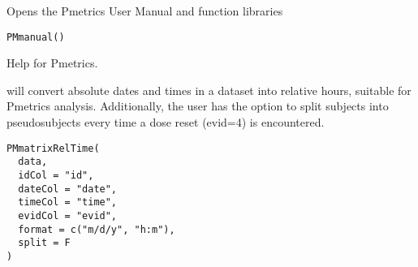 \documentclass[a4paper]{book}
\begin{document}
%
\begin{Description}\relax
Opens the Pmetrics User Manual and function libraries
\end{Description}
%
\begin{Usage}
\begin{verbatim}
PMmanual()
\end{verbatim}
\end{Usage}
%
\begin{Details}\relax
Help for Pmetrics.
\end{Details}
%
\begin{Description}\relax
{} will convert absolute dates and times in a dataset
into relative hours, suitable for Pmetrics analysis.  Additionally, the user has
the option to split subjects into pseudosubjects every time a dose reset (evid=4)
is encountered.
\end{Description}
%
\begin{Usage}
\begin{verbatim}
PMmatrixRelTime(
  data,
  idCol = "id",
  dateCol = "date",
  timeCol = "time",
  evidCol = "evid",
  format = c("m/d/y", "h:m"),
  split = F
)
\end{verbatim}
\end{Usage}
%
\end{document}
